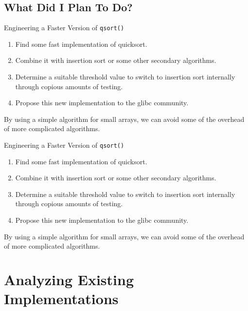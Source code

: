 \documentclass[13pt]{beamer}
\begin{document}
\subsection{What Did I Plan To Do?}
\begin{frame}{Engineering a Faster Version of \texttt{qsort()}}
	\pause
	\begin{enumerate}[<+->]
		\item Find some fast implementation of quicksort.
		\item Combine it with insertion sort or some other secondary
		      algorithms.
		\item Determine a suitable threshold value to switch to insertion sort
		      internally through copious amounts of testing.
		\item Propose this new implementation to the glibc community.
	\end{enumerate}

	\pause
	\vspace{0.3cm}
	By using a simple algorithm for small arrays, we can avoid some of the
	overhead of more complicated algorithms.
\end{frame}
\begin{frame}{Engineering a Faster Version of \texttt{qsort()}}
	\begin{enumerate}
		\item Find some fast implementation of quicksort.
		\item Combine it with insertion sort or some other secondary
		      algorithms.
		\item \color{red}Determine a suitable threshold value to switch to insertion sort
		      internally through copious amounts of testing.\normalcolor
		\item Propose this new implementation to the glibc community.
	\end{enumerate}

	\vspace{0.3cm}
	By using a simple algorithm for small arrays, we can avoid some of the
	overhead of more complicated algorithms.
\end{frame}


\section{Analyzing Existing Implementations}
\end{document}
